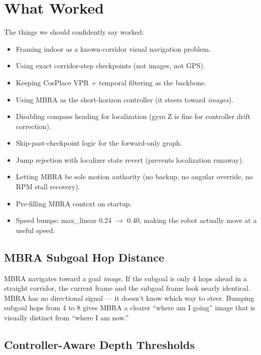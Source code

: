 \documentclass[11pt]{article}
\begin{document}
\section{What Worked}

The things we should confidently say worked:
\begin{itemize}
\item Framing indoor as a known-corridor visual navigation problem.
\item Using exact corridor-step checkpoints (not images, not GPS).
\item Keeping CosPlace VPR + temporal filtering as the backbone.
\item Using MBRA as the short-horizon controller (it steers toward \emph{images}).
\item Disabling compass heading for localization (gyro Z is fine for controller drift correction).
\item Skip-past-checkpoint logic for the forward-only graph.
\item Jump rejection with localizer state revert (prevents localization runaway).
\item Letting MBRA be sole motion authority (no backup, no angular override, no RPM stall recovery).
\item Pre-filling MBRA context on startup.
\item Speed bumps: max\_linear 0.24 $\to$ 0.40, making the robot actually move at a useful speed.
\end{itemize}

\subsection{MBRA Subgoal Hop Distance}
\label{sec:subgoal_hops}

MBRA navigates toward a goal \emph{image}. If the subgoal is only 4 hops ahead in a straight corridor, the current frame and the subgoal frame look nearly identical. MBRA has no directional signal --- it doesn't know which way to steer. Bumping subgoal hops from 4 to 8 gives MBRA a clearer ``where am I going'' image that is visually distinct from ``where I am now.''

\subsection{Controller-Aware Depth Thresholds}
\end{document}
